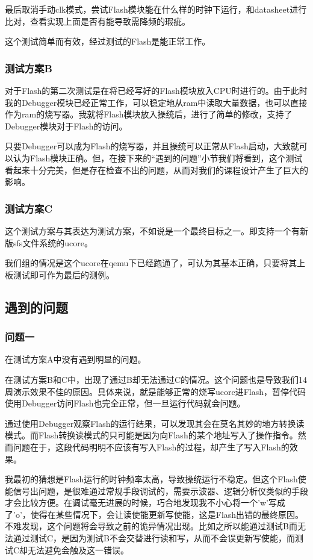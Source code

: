 最后取消手动clk模式，尝试Flash模块能在什么样的时钟下运行，和datasheet进行比对，查看实现上面是否有能导致需降频的瑕疵。

这个测试简单而有效，经过测试的Flash是能正常工作。


\subsubsection{测试方案B}
对于Flash的第二次测试是在将已经写好的Flash模块放入CPU时进行的。由于此时我的Debugger模块已经正常工作，可以稳定地从ram中读取大量数据，也可以直接作为ram的烧写器。我就将Flash模块放入操统后，进行了简单的修改，支持了Debugger模块对于Flash的访问。

只要Debugger可以成为Flash的烧写器，并且操统可以正常从Flash启动，大致就可以认为Flash模块正确。但，在接下来的“遇到的问题”小节我们将看到，这个测试看起来十分完美，但是存在检查不出的问题，从而对我们的课程设计产生了巨大的影响。

\subsubsection{测试方案C}
这个测试方案与其表达为测试方案，不如说是一个最终目标之一。即支持一个有新版sfs文件系统的ucore。

我们组的情况是这个ucore在qemu下已经跑通了，可认为其基本正确，只要将其上板测试即可作为最后的测例。

\subsection{遇到的问题}
\subsubsection{问题一}
在测试方案A中没有遇到明显的问题。

在测试方案B和C中，出现了通过B却无法通过C的情况。这个问题也是导致我们14周演示效果不佳的原因。具体来说，就是能够正常的烧写ucore进Flash，暂停代码使用Debugger访问Flash也完全正常，但一旦运行代码就会问题。

通过使用Debugger观察Flash的运行结果，可以发现其会在莫名其妙的地方转换读模式。而Flash转换读模式的只可能是因为向Flash的某个地址写入了操作指令。然而问题在于，这段代码明明不应该有写入Flash的过程，却产生了写入Flash的效果。

我最初的猜想是Flash运行的时钟频率太高，导致操统运行不稳定。但这个Flash使能信号出问题，是很难通过常规手段调试的，需要示波器、逻辑分析仪类似的手段才会比较方便。在调试毫无进展的时候，巧合地发现我不小心将一个'w'写成了'o'，使得在某些情况下，会让读使能更新写使能，这是Flash出错的最终原因。不难发现，这个问题将会导致之前的诡异情况出现。比如之所以能通过测试B而无法通过测试C，是因为测试B不会交替进行读和写，从而不会误更新写使能，而测试C却无法避免会触及这一错误。


